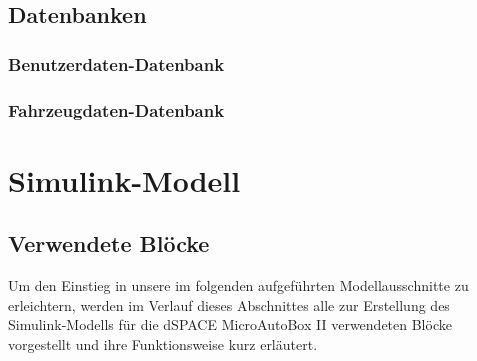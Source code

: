 \documentclass[fontsize = 12pt, paper = a4]{scrreprt}
\begin{document}
\subsection{Datenbanken}

\subsubsection{Benutzerdaten-Datenbank}

\subsubsection{Fahrzeugdaten-Datenbank}





\section{Simulink-Modell}
\subsection{Verwendete Blöcke}

Um den Einstieg in unsere im folgenden aufgeführten Modellausschnitte  zu erleichtern, werden im Verlauf dieses Abschnittes alle zur Erstellung des Simulink-Modells für die dSPACE MicroAutoBox II verwendeten Blöcke vorgestellt und ihre Funktionsweise kurz erläutert.
\end{document}
